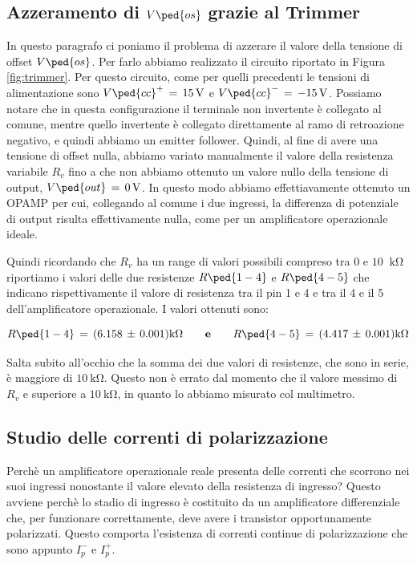 \subsection*{Azzeramento di $V\ped{os}$ grazie al Trimmer}

In questo paragrafo ci poniamo il problema di azzerare il valore della tensione di offset $V\ped{os}$. Per farlo abbiamo realizzato il circuito riportato in Figura \ref{fig:trimmer}.
Per questo circuito, come per quelli precedenti le tensioni di alimentazione sono $V\ped{cc}^+\,=\,\SI{+15}{\volt}$ e $V\ped{cc}^-\,=\,\SI{-15}{\volt}$.
Possiamo notare che in questa configurazione il terminale non invertente è collegato al comune, mentre quello invertente è collegato direttamente al ramo di retroazione negativo, e quindi abbiamo un emitter follower.
Quindi, al fine di avere una tensione di offset nulla, abbiamo variato manualmente il valore della resistenza variabile $R_v$ fino a che non abbiamo ottenuto un valore nullo della tensione di output, $V\ped{out}\,=\,\SI{0}{\volt}$.
In questo modo abbiamo effettiavamente ottenuto un OPAMP per cui, collegando al comune i due ingressi, la differenza di potenziale di output risulta effettivamente nulla, come per un amplificatore operazionale ideale.

Quindi ricordando che $R_v$ ha un range di valori possibili compreso tra $0$ e $10$ $\SI{}{\kilo\ohm}$ riportiamo i valori delle due resistenze $R\ped{1-4}$ e $R\ped{4-5}$ che indicano rispettivamente il valore di resistenza tra il pin 1 e 4  e tra il 4 e il 5 dell'amplificatore operazionale. I valori ottenuti sono:

\begin{equation}
	R\ped{1-4}\,=\,(6.158\,\pm\,0.001)\SI{}{\kilo\ohm} \qquad \textbf{e} \qquad R\ped{4-5}\,=\,(4.417\,\pm\,0.001)\SI{}{\kilo\ohm}
\end{equation}

Salta subito all'occhio che la somma dei due valori di resistenze, che sono in serie, è maggiore di $\SI{10}{\kilo\ohm}$. Questo non è errato dal momento che il valore messimo di $R_v$ e superiore a $\SI{10}{\kilo\ohm}$, in quanto lo abbiamo misurato col multimetro.

\subsection*{Studio delle correnti di polarizzazione}

Perchè un amplificatore operazionale reale presenta delle correnti che scorrono nei suoi ingressi nonostante il valore elevato della resistenza di ingresso? Questo avviene perchè lo stadio di ingresso è costituito da un amplificatore differenziale che, per funzionare correttamente, deve avere i transistor opportunamente polarizzati. Questo comporta l'esistenza di correnti continue di polarizzazione che sono appunto $I_{p}^-$ e $I_{p}^+$.

